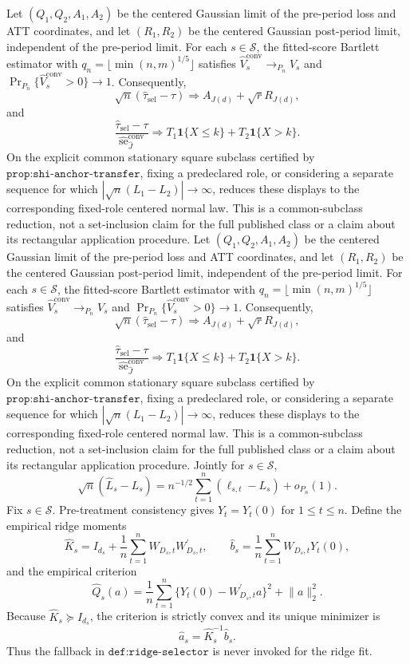 Let \((Q_1,Q_2,A_1,A_2)\) be the centered Gaussian limit of the pre-period loss and ATT coordinates, and let \((R_1,R_2)\) be the centered Gaussian post-period limit, independent of the pre-period limit.  For each \(s\in\mathcal S\), the fitted-score Bartlett estimator with \(q_n=\lfloor\min(n,m)^{1/5}\rfloor\) satisfies \(\widehat V_s^{\mathrm{conv}}\to_{P_n}V_s\) and \(\Pr_{P_n}\{\widehat V_s^{\mathrm{conv}}>0\}\to1\).  Consequently,
\[
 \sqrt n(\widehat\tau_{\mathrm{sel}}-\tau)
 \Rightarrow A_{J(d)}+\sqrt rR_{J(d)},
\]
and
\[
 \frac{\widehat\tau_{\mathrm{sel}}-\tau}
 {\widehat{\operatorname{se}}^{\mathrm{conv}}_{\widehat J}}
 \Rightarrow
 T_1\mathbf 1\{X\leq k\}+T_2\mathbf 1\{X>k\}.
\]
On the explicit common stationary square subclass certified by \(\texttt{prop:shi-anchor-transfer}\), fixing a predeclared role, or considering a separate sequence for which \(|\sqrt n(L_1-L_2)|\to\infty\), reduces these displays to the corresponding fixed-role centered normal law.  This is a common-subclass reduction, not a set-inclusion claim for the full published class or a claim about its rectangular application procedure.
Let \((Q_1,Q_2,A_1,A_2)\) be the centered Gaussian limit of the pre-period loss and ATT coordinates, and let \((R_1,R_2)\) be the centered Gaussian post-period limit, independent of the pre-period limit.  For each \(s\in\mathcal S\), the fitted-score Bartlett estimator with \(q_n=\lfloor\min(n,m)^{1/5}\rfloor\) satisfies \(\widehat V_s^{\mathrm{conv}}\to_{P_n}V_s\) and \(\Pr_{P_n}\{\widehat V_s^{\mathrm{conv}}>0\}\to1\).  Consequently,
\[
 \sqrt n(\widehat\tau_{\mathrm{sel}}-\tau)
 \Rightarrow A_{J(d)}+\sqrt rR_{J(d)},
\]
and
\[
 \frac{\widehat\tau_{\mathrm{sel}}-\tau}
 {\widehat{\operatorname{se}}^{\mathrm{conv}}_{\widehat J}}
 \Rightarrow
 T_1\mathbf 1\{X\leq k\}+T_2\mathbf 1\{X>k\}.
\]
On the explicit common stationary square subclass certified by \(\texttt{prop:shi-anchor-transfer}\), fixing a predeclared role, or considering a separate sequence for which \(|\sqrt n(L_1-L_2)|\to\infty\), reduces these displays to the corresponding fixed-role centered normal law.  This is a common-subclass reduction, not a set-inclusion claim for the full published class or a claim about its rectangular application procedure.
Jointly for \(s\in\mathcal S\),
\[
 \sqrt n(\widehat L_s-L_s)
 =n^{-1/2}\sum_{t=1}^n(\ell_{s,t}-L_s)+o_{P_n}(1).
\]
Fix \(s\in\mathcal S\).  Pre-treatment consistency gives \(Y_t=Y_t(0)\) for \(1\leq t\leq n\).  Define the empirical ridge moments
\[
 \widehat K_s=I_{d_s}+\frac1n\sum_{t=1}^n
 W_{D_s,t}W_{D_s,t}^{\prime},
 \qquad
 \widehat b_s=\frac1n\sum_{t=1}^nW_{D_s,t}Y_t(0),
\]
and the empirical criterion
\[
 \widehat Q_s(a)=\frac1n\sum_{t=1}^n
 \{Y_t(0)-W_{D_s,t}^{\prime}a\}^2+\lVert a\rVert_2^2.
\]
Because \(\widehat K_s\succeq I_{d_s}\), the criterion is strictly convex and its unique minimizer is
\[
 \widehat a_s=\widehat K_s^{-1}\widehat b_s.
\]
Thus the fallback in \(\texttt{def:ridge-selector}\) is never invoked for the ridge fit.

